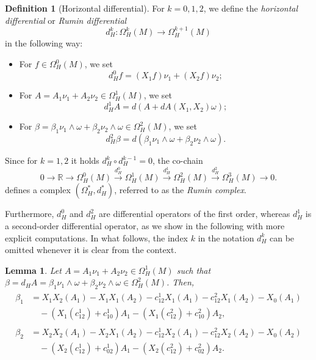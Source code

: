 \documentclass{amsart}
\theoremstyle{plain}
\newtheorem{lemma}[theorem]{Lemma}
\theoremstyle{definition}
\newtheorem{definition}[thm]{Definition}
\theoremstyle{remark}
\newcommand{\R}{\mathbb{R}}
\newcommand{\diff}{d}%
\newcommand{\B}{\beta}
\newcommand{\mg}{\B_1\nu_1\wedge \omega
										+\B_2\nu_2\wedge \omega}	%
\begin{document}
\begin{definition}[Horizontal differential]
For $k=0,1,2$, we define the \emph{horizontal differential} or \emph{Rumin differential}
\begin{equation}
\diff^k_H:\Omega^k_H(M)\to \Omega^{k+1}_H(M)
\end{equation}
in the following way:
\begin{itemize}
\item[(i)] For $f\in \Omega_H^0(M)$, we set
	\begin{equation}	\label{eq:dH0}
		\diff^0_H f %
		=(X_1f)\nu_1+(X_2f)\nu_2;
	\end{equation}
\item[(ii)] For $A=A_1\nu_1+A_2\nu_2\in \Omega_H^1(M)$, we set
	\begin{equation}	\label{eq:dH1}
		\diff^1_HA=\diff\left(A+\diff A(X_1,X_2)\omega\right);
	\end{equation}
\item[(iii)] For $\B=\mg\in \Omega^2_H(M)$, we set
	\begin{equation}	\label{eq:dH2}
		\diff^2_H \B=\diff\left(\mg\right).
	\end{equation}
\end{itemize}
\end{definition}
 Since  for $k=1,2$ it holds $\diff_H^k\circ\diff_H^{k-1}=0$, the co-chain 
 \begin{equation}
0 \longrightarrow \R\longrightarrow 
 \Omega^0_H(M)
\stackrel{\diff_H^0}{\longrightarrow} 
 \Omega^1_H(M)
\stackrel{\diff^1_H}{\longrightarrow} 
\Omega^2_H(M)
\stackrel{\diff_H^2}{\longrightarrow}  
\Omega^3_H(M)
\longrightarrow 0.
\end{equation}
defines a complex  $\left(\Omega_H^*,\diff^*_H\right)$, referred to as the \emph{Rumin complex}. 

Furthermore, $\diff_H^0$ and $\diff_H^2$ are differential operators of the first order, whereas $\diff_H^1$ is a second-order differential operator, as we show in the following with more explicit computations. In what follows, the index $k$ in the notation $\diff_H^k$ can be omitted whenever it is clear from the context.  


\begin{lemma}
\label{lem:d_H}
Let $A=A_1\nu_1+A_2\nu_2\in \Omega^1_H(M)$ such that $\beta=\diff_H A=\mg \in \Omega^2_H(M)$. Then,
\begin{align}
\begin{split}\label{eq:B_1}
\beta_1&=X_1X_2(A_1)-X_1X_1(A_2)-c^1_{12}X_1(A_1)-c^2_{12}X_1(A_2)-X_0(A_1)
\\ & \quad-(X_1(c^1_{12})+c^1_{10})A_1-(X_1(c^2_{12})+c^2_{10})A_2, \end{split}
\\ \begin{split} \label{eq:B_2}
\beta_2&= X_2X_2(A_1)-X_2X_1(A_2)-c^1_{12}X_2(A_1)-c^2_{12}X_2(A_2)-X_0(A_2)
\\ & \quad-(X_2(c^1_{12})+c^1_{02})A_1-(X_2(c^2_{12})+c^2_{02})A_2. \end{split}
\end{align}
\end{lemma}
\end{document}
